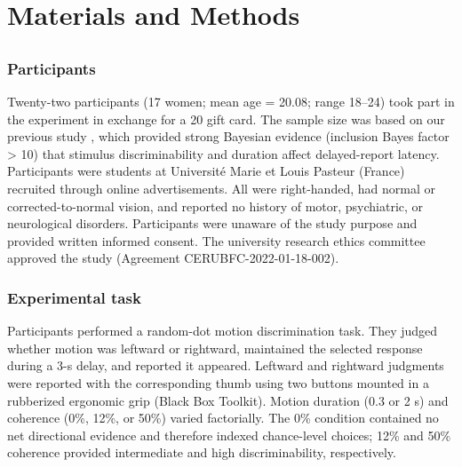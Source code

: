  


\section{Materials and Methods}


\subsection{}


\subsubsection{Participants}

Twenty-two participants (17 women; mean age = 20.08; range 18--24) took part in the experiment in exchange for a \texteuro{}20 gift card.  The sample size was based on our previous study \parencite[Experiment 2]{achardExtendingContinuousFlow2025}, which provided  strong Bayesian evidence (inclusion Bayes factor > 10) that  stimulus discriminability and duration affect delayed-report latency.  Participants were students at  Universit\'e Marie et Louis Pasteur (France) recruited through online advertisements. All were right-handed, had normal or corrected-to-normal vision, and reported no history of motor, psychiatric, or neurological disorders. Participants were unaware of the study purpose and provided written informed consent. The university research ethics committee approved the study (Agreement CERUBFC-2022-01-18-002).


\subsubsection{Experimental task}

Participants performed a  random-dot motion discrimination task. They judged  whether motion was leftward or rightward, maintained the selected response during a 3-s delay, and reported it  appeared. Leftward and rightward judgments were reported with the corresponding thumb using two buttons mounted in a rubberized ergonomic grip (Black Box Toolkit).  Motion duration (0.3 or 2 s) and coherence (0\%, 12\%, or 50\%) varied factorially. The 0\% condition contained no net directional evidence and therefore indexed chance-level choices; 12\% and 50\% coherence provided intermediate and high discriminability, respectively.

